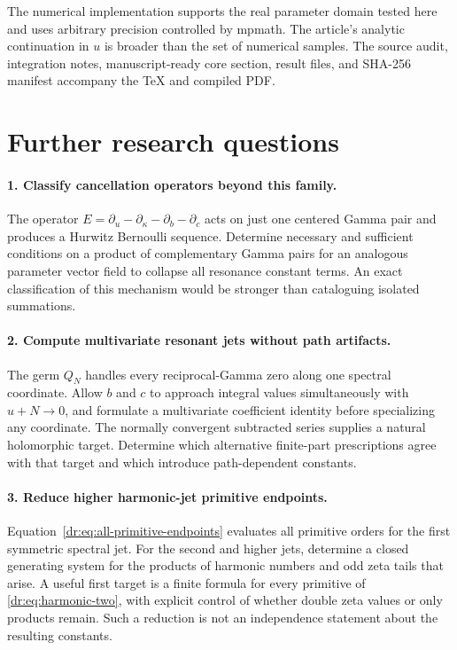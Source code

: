 \documentclass[11pt,letterpaper]{article}
\numberwithin{equation}{section}
\theoremstyle{definition}
\theoremstyle{remark}
\begin{document}
The numerical implementation supports the real parameter domain tested
here and uses arbitrary precision controlled by mpmath. The article's
analytic continuation in $u$ is broader than the set of numerical samples.
The source audit, integration notes, manuscript-ready core section, result
files, and SHA-256 manifest accompany the TeX and compiled PDF.

\section{Further research questions}
\label{dr:sec:future}

\paragraph{1. Classify cancellation operators beyond this family.}
The operator $E=\partial_u-\partial_\kappa-\partial_b-\partial_c$
acts on just one centered Gamma pair and produces a Hurwitz Bernoulli
sequence. Determine necessary and sufficient conditions on a product of
complementary Gamma pairs for an analogous parameter vector field to
collapse all resonance constant terms. An exact classification of this
mechanism would be stronger than cataloguing isolated summations.

\paragraph{2. Compute multivariate resonant jets without path artifacts.}
The germ $Q_N$ handles every reciprocal-Gamma zero along one spectral
coordinate. Allow $b$ and $c$ to approach integral values simultaneously
with $u+N\to0$, and formulate a multivariate coefficient identity before
specializing any coordinate. The normally convergent subtracted series
supplies a natural holomorphic target. Determine which alternative
finite-part prescriptions agree with that target and which introduce
path-dependent constants.

\paragraph{3. Reduce higher harmonic-jet primitive endpoints.}
Equation~\eqref{dr:eq:all-primitive-endpoints} evaluates all primitive
orders for the first symmetric spectral jet. For the second and higher
jets, determine a closed generating system for the products of harmonic
numbers and odd zeta tails that arise. A useful first target is a finite
formula for every primitive of \eqref{dr:eq:harmonic-two}, with explicit
control of whether double zeta values or only products remain. Such a
reduction is not an independence statement about the resulting constants.
\end{document}
